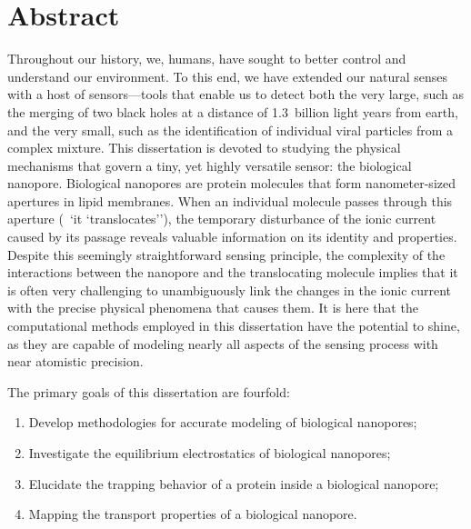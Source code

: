 \chapter{Abstract}
%
\label{ch:abstract}
%

Throughout our history, we, humans, have sought to better control and understand our environment. To this end,
we have extended our natural senses with a host of sensors---tools that enable us to detect both the very
large, such as the merging of two black holes at a distance of \num{1.3}~billion light years from earth, and
the very small, such as the identification of individual viral particles from a complex mixture. This
dissertation is devoted to studying the physical mechanisms that govern a tiny, yet highly versatile sensor:
the biological nanopore. Biological nanopores are protein molecules that form nanometer-sized apertures in
lipid membranes. When an individual molecule passes through this aperture (\ie~`it `translocates''), the
temporary disturbance of the ionic current caused by its passage reveals valuable information on its identity
and properties. Despite this seemingly straightforward sensing principle, the complexity of the interactions
between the nanopore and the translocating molecule implies that it is often very challenging to unambiguously
link the changes in the ionic current with the precise physical phenomena that causes them. It is here that
the computational methods employed in this dissertation have the potential to shine, as they are capable of
modeling nearly all aspects of the sensing process with near atomistic precision.

The primary goals of this dissertation are fourfold:
%
\begin{enumerate}
  \item Develop methodologies for accurate modeling of biological nanopores;
  \item Investigate the equilibrium electrostatics of biological nanopores;
  \item Elucidate the trapping behavior of a protein inside a biological nanopore;
  \item Mapping the transport properties of a biological nanopore.
\end{enumerate}
%

